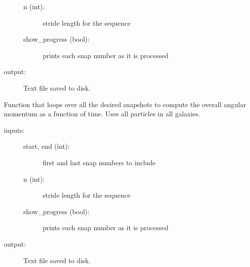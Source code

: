 \documentclass[letterpaper,10pt,english]{sphinxmanual}
\begin{document}
\begin{fulllineitems}
\begin{fulllineitems}
\begin{description}
\begin{description}
\item[{n (int):}] \leavevmode
stride length for the sequence

\item[{show\_progress (bool):}] \leavevmode
prints each snap number as it is processed

\end{description}

\item[{output: }] \leavevmode
Text file saved to disk.

\end{description}

\end{fulllineitems}


\begin{fulllineitems}
\label{\detokenize{timecourse:galaxy.timecourse.TimeCourse.write_total_angmom}}
Function that loops over all the desired snapshots to compute the overall 
angular momentum as a function of time. Uses all particles in all galaxies.
\begin{description}
\item[{inputs:}] \leavevmode\begin{description}
\item[{start, end (int):}] \leavevmode
first and last snap numbers to include

\item[{n (int):}] \leavevmode
stride length for the sequence

\item[{show\_progress (bool):}] \leavevmode
prints each snap number as it is processed

\end{description}

\item[{output: }] \leavevmode
Text file saved to disk.

\end{description}

\end{fulllineitems}



\end{fulllineitems}
\end{document}

